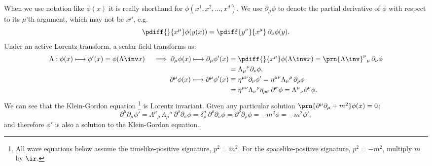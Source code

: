 \documentclass[11pt]{article}
\begin{document}
When we use notation like \(\phi(x)\) it is really shorthand for \(\phi(x^1,x^2,\ldots,x^d)\).
We use \(\partial_\mu\phi\) to denote the partial derivative of \(\phi\) with respect to its \(\mu\)'th argument, which may not be \(x^\mu\), e.g.
%
\begin{equation*}
  \pdiff{}{x^\mu} \phi(y(x)) = \pdiff{y^\nu}{x^\mu} \, \partial_\nu \phi(y).
\end{equation*}
%
Under an active Lorentz transform, a scalar field transforms as:
%
\begin{equation*}
\begin{aligned}
  \Lambda: \phi(x) \longmapsto \phi'(x) = \phi(\Lambda\inv x)
  \quad \implies
  \partial_\mu \phi(x) \longmapsto \partial_\mu \phi'(x) 
    &= \pdiff{}{x^\mu} \phi(\Lambda\inv x)
    = \prn{\Lambda\inv}^\nu{}_\mu\, \partial_\nu \phi \\
    &= \Lambda_\mu{}^\nu \partial_\nu \phi, \\
  \partial^\mu \phi(x) \longmapsto \partial^\mu \phi'(x) 
    &\equiv \eta^{\mu\nu} \partial_\nu \phi'
    = \eta^{\mu\nu} \Lambda_\nu{}^\rho\, \partial_\rho \phi \\
    &= \eta^{\mu\nu} \Lambda_\nu{}^\rho \eta_{\rho\sigma}\, \partial^\sigma \phi 
    = \Lambda^\mu{}_\nu \partial^\nu \phi.
\end{aligned}
\end{equation*}
%
We can see that the Klein-Gordon equation%
\footnote{All wave equations below assume the timelike-positive signature, \(p^2 = m^2\).
For the spacelike-positive signature, \(p^2 = - m^2\), multiply \(m\) by \(\ir\).} 
is Lorentz invariant.
Given any particular solution \(\prn{\partial^\mu \partial_\mu + m^2} \phi(x) = 0\):
%
\begin{equation}\label{eq:kleingordoninvt}
  \partial^\mu \partial_\mu \phi' 
    = \Lambda^\mu{}_\rho\, \Lambda_\mu{}^\sigma\, \partial^\rho \partial_\sigma \phi 
    = \delta_\rho^\sigma\, \partial^\rho \partial_\sigma \phi
    = \partial^\rho \partial_\rho \phi
    = -m^2 \phi
    = -m^2 \phi',
\end{equation}
%
and therefore \(\phi'\) is also a solution to the Klein-Gordon equation..
\end{document}
